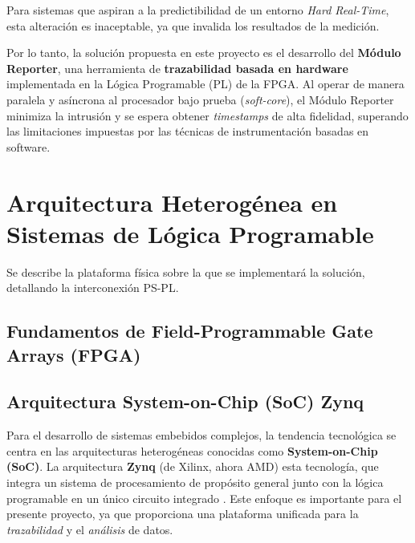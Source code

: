 Para sistemas que aspiran a la predictibilidad de un entorno \textit{Hard Real-Time}, esta alteración es inaceptable, ya que invalida los resultados de la medición.

Por lo tanto, la solución propuesta en este proyecto es el desarrollo del \textbf{Módulo Reporter}, una herramienta de \textbf{trazabilidad basada en hardware} implementada en la Lógica Programable (PL) de la FPGA. Al operar de manera paralela y asíncrona al procesador bajo prueba (\textit{soft-core}), el Módulo Reporter minimiza la intrusión y se espera obtener \textit{timestamps} de alta fidelidad, superando las limitaciones impuestas por las técnicas de instrumentación basadas en software.

\section{Arquitectura Heterogénea en Sistemas de Lógica Programable}
\label{sec:arquitectura_fpga}

Se describe la plataforma física sobre la que se implementará la solución, detallando la interconexión PS-PL.

\subsection{Fundamentos de Field-Programmable Gate Arrays (FPGA)}
\label{ssec:fundamentos_fpga}

\subsection{Arquitectura System-on-Chip (SoC) Zynq}
\label{ssec:arquitectura_zynq}

Para el desarrollo de sistemas embebidos complejos, la tendencia tecnológica se centra en las arquitecturas heterogéneas conocidas como \textbf{System-on-Chip (SoC)}. La arquitectura \textbf{Zynq} (de Xilinx, ahora AMD) esta tecnología, que integra un sistema de procesamiento de propósito general junto con la lógica programable en un único circuito integrado  . Este enfoque es importante para el presente proyecto, ya que proporciona una plataforma unificada para la \textit{trazabilidad} y el \textit{análisis} de datos.

